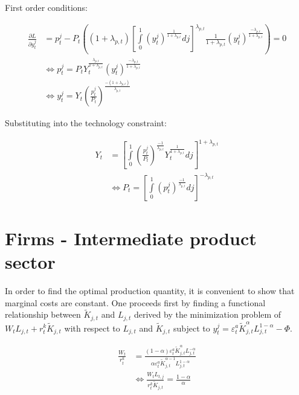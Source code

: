 \documentclass{pracamgr}
\numberwithin{equation}{section}
\begin{document}
First order conditions:

\begin{align}
\frac{\partial L}{\partial y_{t}^{j}} &= p_{t}^{j} - P_{t} \left( \left( 1+\lambda_{p,t} \right) \left[ \int\limits_{0}^{1} \left(y_{t}^{j} \right)^\frac{1}{1+\lambda_{p,t}} dj \right]^{\lambda_{p,t}} \frac{1}{1+\lambda_{p,t}} \left( y_{t}^{j} \right)^{ \frac{-\lambda_{p,t}}{1+\lambda_{p,t}}} \right) = 0 \nonumber \\
&  \iff p_{t}^{j} = P_{t}  Y_{t}^{ \frac{\lambda_{p,t}}{1+\lambda_{p,t}}} \left( y_{t}^{j} \right)^{ \frac{-\lambda_{p,t}}{1+\lambda_{p,t}}} \nonumber \\
& \iff y_{t}^{j} = Y_{t} \left( \frac{p_{t}^{j}}{P_{t}} \right)^{ \frac{-(1+\lambda_{p,t})}{\lambda_{p,t}}} 
\end{align}

Substituting into the technology constraint:

\begin{align}
Y_{t} &=  \left[ \int\limits_{0}^{1} \left( \frac{ p_{t}^{j}}{P_{t}} \right)^{\frac{-1}{\lambda_{p,t}}} Y_{t}^\frac{1}{1+\lambda_{p,t}} dj \right]^{1+\lambda_{p,t}} \nonumber \\
& \iff P_{t} = \left[ \int\limits_{0}^{1} \left( p_{t}^{j} \right)^{\frac{-1}{\lambda_{p,t}}} dj \right]^{-\lambda_{p,t}}
\end{align}


\section*{Firms - Intermediate product sector}

In order to find the optimal production quantity, it is convenient to show that marginal costs are constant. One proceeds first by finding a functional relationship between $\widetilde{K}_{j,t}$ and $L_{j,t}$ derived by the minimization problem of $W_{t}L_{j,t} + r_{t}^{k} \widetilde{K}_{j,t}$ with respect to $L_{j,t}$ and $\widetilde{K}_{j,t}$ subject to $y_{t}^{j} = \varepsilon_{t}^{a} \widetilde{K}_{j,t}^{\alpha} L_{j,t}^{1-\alpha} - \Phi$.

\begin{align}
\frac{W_{t}}{r_{t}^{k}} &= \frac{(1-\alpha)\varepsilon_{t}^{a} \widetilde{K}_{j,t}^{\alpha} L_{j,t}^{-\alpha} }{\alpha \varepsilon_{t}^{a} \widetilde{K}_{j,t}^{\alpha-1} L_{j,t}^{1-\alpha} } \nonumber \\
& \iff \frac{W_{t}L_{t,j}}{r_{t}^{k}  \widetilde{K}_{j,t}} = \frac{1-\alpha}{\alpha}
\end{align}
\end{document}
